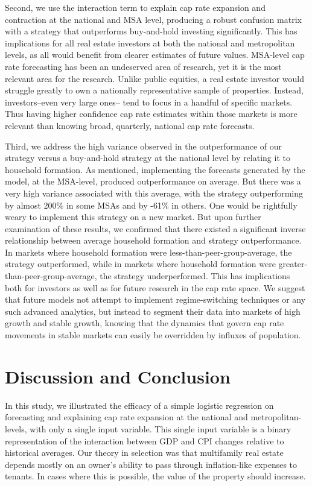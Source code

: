 \documentclass[jrfm,article,submit,oneauthor,pdftex]{Definitions/mdpi}
\begin{document}
Second, we use the interaction term to explain cap rate expansion and contraction at the national and MSA level, producing a robust confusion matrix with a strategy that outperforms buy-and-hold investing significantly. This has implications for all real estate investors at both the national and metropolitan levels, as all would benefit from clearer estimates of future values. MSA-level cap rate forecasting has been an undeserved area of research, yet it is the most relevant area for the research. Unlike public equities, a real estate investor would struggle greatly to own a nationally representative sample of properties. Instead, investors--even very large ones-- tend to focus in a handful of specific markets. Thus having higher confidence cap rate estimates within those markets is more relevant than knowing broad, quarterly, national cap rate forecasts.

Third, we address the high variance observed in the outperformance of our strategy versus a buy-and-hold strategy at the national level by relating it to household formation. As mentioned, implementing the forecasts generated by the model, at the MSA-level, produced outperformance on average. But there was a very high variance associated with this average, with the strategy outperforming by almost 200\% in some MSAs and by -61\% in others. One would be rightfully weary to implement this strategy on a new market. But upon further examination of these results, we confirmed that there existed a significant inverse relationship between average household formation and strategy outperformance. In markets where household formation were less-than-peer-group-average, the strategy outperformed, while in markets where household formation were greater-than-peer-group-average, the strategy underperformed. This has implications both for investors as well as for future research in the cap rate space. We suggest that future models not attempt to implement regime-switching techniques or any such advanced analytics, but instead to segment their data into markets of high growth and stable growth, knowing that the dynamics that govern cap rate movements in stable markets can easily be overridden by influxes of population. 


\section{Discussion and Conclusion}

In this study, we illustrated the efficacy of a simple logistic regression on forecasting and explaining cap rate expansion at the national and metropolitan-levels, with only a single input variable. This single input variable is a binary representation of the interaction between GDP and CPI changes relative to historical averages. Our theory in selection was that multifamily real estate depends mostly on an owner's ability to pass through inflation-like expenses to tenants. In cases where this is possible, the value of the property should increase.
\end{document}
